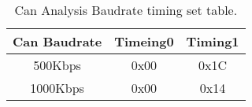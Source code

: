 \begin{table}[htb!]
	\caption[Can Analysis Baudrate timing set table]{Can Analysis Baudrate timing set table.}
	\begin{tabular}{ c c c }
		\toprule
		Can Baudrate & Timeing0 & Timing1 \\
		\midrule
		500Kbps  & 0x00  &   0x1C \\
		\midrule
		1000Kbps  & 0x00  &   0x14 \\
		\bottomrule
	\end{tabular}
\end{table}



